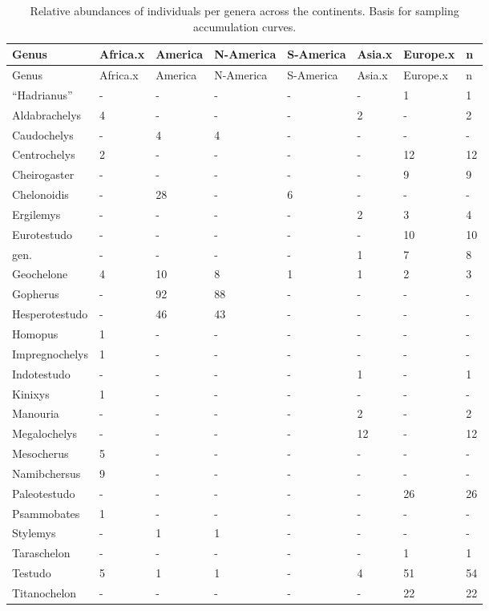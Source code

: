 \documentclass[]{article}
\begin{document}
\begin{longtable}[]{@{}llllllll@{}}
\caption{Relative abundances of individuals per genera across the
continents. Basis for sampling accumulation curves.}\tabularnewline
\toprule
Genus & Africa.x & America & N-America & S-America & Asia.x & Europe.x &
n\tabularnewline
\midrule
\endfirsthead
\toprule
Genus & Africa.x & America & N-America & S-America & Asia.x & Europe.x &
n\tabularnewline
\midrule
\endhead
``Hadrianus'' & - & - & - & - & - & 1 & 1\tabularnewline
Aldabrachelys & 4 & - & - & - & 2 & - & 2\tabularnewline
Caudochelys & - & 4 & 4 & - & - & - & -\tabularnewline
Centrochelys & 2 & - & - & - & - & 12 & 12\tabularnewline
Cheirogaster & - & - & - & - & - & 9 & 9\tabularnewline
Chelonoidis & - & 28 & - & 6 & - & - & -\tabularnewline
Ergilemys & - & - & - & - & 2 & 3 & 4\tabularnewline
Eurotestudo & - & - & - & - & - & 10 & 10\tabularnewline
gen. & - & - & - & - & 1 & 7 & 8\tabularnewline
Geochelone & 4 & 10 & 8 & 1 & 1 & 2 & 3\tabularnewline
Gopherus & - & 92 & 88 & - & - & - & -\tabularnewline
Hesperotestudo & - & 46 & 43 & - & - & - & -\tabularnewline
Homopus & 1 & - & - & - & - & - & -\tabularnewline
Impregnochelys & 1 & - & - & - & - & - & -\tabularnewline
Indotestudo & - & - & - & - & 1 & - & 1\tabularnewline
Kinixys & 1 & - & - & - & - & - & -\tabularnewline
Manouria & - & - & - & - & 2 & - & 2\tabularnewline
Megalochelys & - & - & - & - & 12 & - & 12\tabularnewline
Mesocherus & 5 & - & - & - & - & - & -\tabularnewline
Namibchersus & 9 & - & - & - & - & - & -\tabularnewline
Paleotestudo & - & - & - & - & - & 26 & 26\tabularnewline
Psammobates & 1 & - & - & - & - & - & -\tabularnewline
Stylemys & - & 1 & 1 & - & - & - & -\tabularnewline
Taraschelon & - & - & - & - & - & 1 & 1\tabularnewline
Testudo & 5 & 1 & 1 & - & 4 & 51 & 54\tabularnewline
Titanochelon & - & - & - & - & - & 22 & 22\tabularnewline
\bottomrule
\end{longtable}
\end{document}
